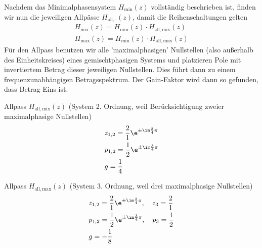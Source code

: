 \begin{ExCalc}
Nachdem das Minimalphasensystem $H_\mathrm{min}(z)$ vollständig beschrieben ist,
finden wir nun die
jeweiligen Allpässe $H_\mathrm{all,\cdot}(z)$, damit die Reihenschaltungen gelten
\begin{align}
H_\mathrm{mix}(z) = H_\mathrm{min}(z) \cdot H_\mathrm{all,mix}(z)\\
H_\mathrm{max}(z) = H_\mathrm{min}(z) \cdot H_\mathrm{all,max}(z)
\end{align}
%
Für den Allpass benutzen wir alle 'maximalphasigen' Nullstellen (also außerhalb des
Einheitskreises) eines gemischtphasigen Systems und platzieren Pole mit invertiertem
Betrag dieser jeweiligen Nullstellen. Dies führt dann zu einem frequenzunabhängigen
Betragsspektrum. Der Gain-Faktor wird dann so gefunden, dass Betrag Eins ist.
%

Allpass $H_\mathrm{all,mix}(z)$ (System 2. Ordnung, weil Berücksichtigung zweier
maximalphasige Nullstellen)
\begin{align}
&z_{1,2} = \frac{2}{1} \e^{\pm\im\frac{3}{4}\pi}\\
&p_{1,2} = \frac{1}{2} \e^{\pm\im\frac{3}{4}\pi}\\
&g=\frac{1}{4}
\end{align}

Allpass $H_\mathrm{all,max}(z)$ (System 3. Ordnung, weil drei maximalphasige
Nullstellen)
\begin{align}
&z_{1,2} = \frac{2}{1} \e^{\pm\im\frac{3}{4}\pi},\quad z_3 = \frac{2}{1}\\
&p_{1,2} = \frac{1}{2} \e^{\pm\im\frac{3}{4}\pi},\quad p_3 = \frac{1}{2}\\
&g=-\frac{1}{8}
\end{align}
\end{ExCalc}
